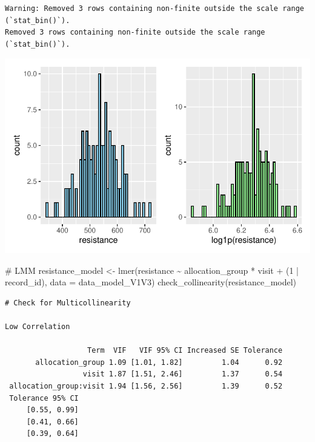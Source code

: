 \documentclass[
  letterpaper,
  DIV=11,
  numbers=noendperiod]{scrartcl}
\newenvironment{Shaded}{\begin{snugshade}}{\end{snugshade}}
\newcommand{\AttributeTok}[1]{\textcolor[rgb]{0.40,0.45,0.13}{#1}}
\newcommand{\CommentTok}[1]{\textcolor[rgb]{0.37,0.37,0.37}{#1}}
\newcommand{\DecValTok}[1]{\textcolor[rgb]{0.68,0.00,0.00}{#1}}
\newcommand{\FunctionTok}[1]{\textcolor[rgb]{0.28,0.35,0.67}{#1}}
\newcommand{\NormalTok}[1]{\textcolor[rgb]{0.00,0.23,0.31}{#1}}
\newcommand{\OtherTok}[1]{\textcolor[rgb]{0.00,0.23,0.31}{#1}}
\newcommand{\SpecialCharTok}[1]{\textcolor[rgb]{0.37,0.37,0.37}{#1}}
\begin{document}
\begin{verbatim}
Warning: Removed 3 rows containing non-finite outside the scale range (`stat_bin()`).
Removed 3 rows containing non-finite outside the scale range (`stat_bin()`).
\end{verbatim}

\includegraphics{Outcomes_V1V2V3_files/figure-pdf/resistance_1-1.pdf}

\begin{Shaded}
\begin{Highlighting}[]
\CommentTok{\# LMM}
\NormalTok{resistance\_model }\OtherTok{\textless{}{-}} \FunctionTok{lmer}\NormalTok{(resistance }\SpecialCharTok{\textasciitilde{}}\NormalTok{ allocation\_group }\SpecialCharTok{*}\NormalTok{ visit }\SpecialCharTok{+}\NormalTok{ (}\DecValTok{1} \SpecialCharTok{|}\NormalTok{ record\_id), }\AttributeTok{data =}\NormalTok{ data\_model\_V1V3)}
\FunctionTok{check\_collinearity}\NormalTok{(resistance\_model)}
\end{Highlighting}
\end{Shaded}

\begin{verbatim}
# Check for Multicollinearity

Low Correlation

                   Term  VIF   VIF 95% CI Increased SE Tolerance
       allocation_group 1.09 [1.01, 1.82]         1.04      0.92
                  visit 1.87 [1.51, 2.46]         1.37      0.54
 allocation_group:visit 1.94 [1.56, 2.56]         1.39      0.52
 Tolerance 95% CI
     [0.55, 0.99]
     [0.41, 0.66]
     [0.39, 0.64]
\end{verbatim}
\end{document}
